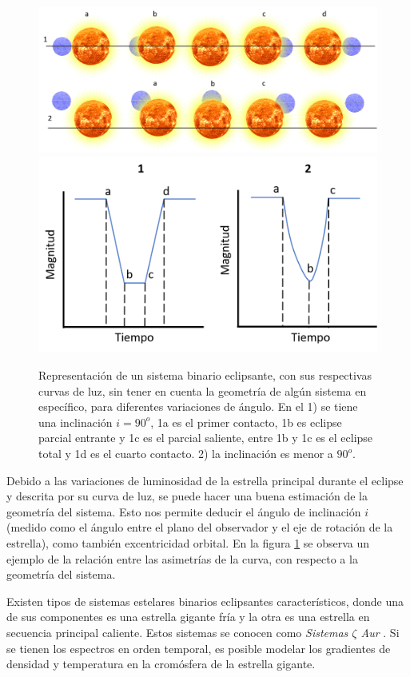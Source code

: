 \documentclass[12pt,oneside,openany,letter]{book}
\begin{document}
\begin{figure}[h]
    \centering
    \includegraphics[width=1\linewidth]{Images/representacion_eclipse.png}
    \includegraphics[width=0.62\linewidth]{Images/curva_luz_.png}
    \caption[Representación de un sistema binario eclipsante, con sus respectivas curvas de luz.]{Representación de un sistema binario eclipsante, con sus respectivas curvas de luz, sin tener en cuenta la geometría de algún sistema en específico, para diferentes variaciones de ángulo. En el 1) se tiene una inclinación $i = 90^{o}$, 1a es el primer contacto, 1b es eclipse parcial entrante y 1c es el parcial saliente, entre 1b y 1c es el eclipse total y 1d es el cuarto contacto. 2) la inclinación es menor a $90^{o}$.}
    \label{representacion_eclipse}
\end{figure}

\noindent Debido a las variaciones de luminosidad de la estrella principal durante el eclipse y descrita por su curva de luz, se puede hacer una buena estimación de la geometría del sistema. Esto nos permite deducir el ángulo de inclinación $i$ (medido como el ángulo entre el plano del observador y el eje de rotación de la estrella), como también excentricidad orbital. En la figura \ref{representacion_eclipse} se observa un ejemplo de la relación entre las asimetrías de la curva, con respecto a la geometría del sistema.



\noindent Existen tipos de sistemas estelares binarios eclipsantes característicos, donde una de sus componentes es una estrella gigante fría y la otra es una estrella en secuencia principal caliente. Estos sistemas se conocen como \textit{Sistemas $\zeta$ Aur} \citep{ake2015giants}. Si se tienen los espectros en orden temporal, es posible modelar los gradientes de densidad y temperatura en la cromósfera de la estrella gigante.
\end{document}
